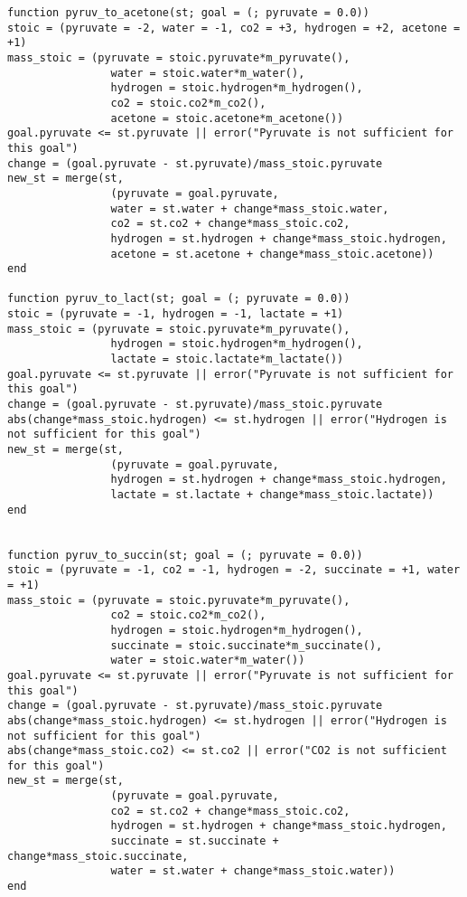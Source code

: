 \documentclass[11pt]{article}
\begin{document}
\begin{verbatim}
function pyruv_to_acetone(st; goal = (; pyruvate = 0.0))
stoic = (pyruvate = -2, water = -1, co2 = +3, hydrogen = +2, acetone = +1)
mass_stoic = (pyruvate = stoic.pyruvate*m_pyruvate(),
                water = stoic.water*m_water(),
                hydrogen = stoic.hydrogen*m_hydrogen(),
                co2 = stoic.co2*m_co2(),
                acetone = stoic.acetone*m_acetone())
goal.pyruvate <= st.pyruvate || error("Pyruvate is not sufficient for this goal")
change = (goal.pyruvate - st.pyruvate)/mass_stoic.pyruvate
new_st = merge(st,
                (pyruvate = goal.pyruvate,
                water = st.water + change*mass_stoic.water,
                co2 = st.co2 + change*mass_stoic.co2,
                hydrogen = st.hydrogen + change*mass_stoic.hydrogen,
                acetone = st.acetone + change*mass_stoic.acetone))
end

function pyruv_to_lact(st; goal = (; pyruvate = 0.0))
stoic = (pyruvate = -1, hydrogen = -1, lactate = +1)
mass_stoic = (pyruvate = stoic.pyruvate*m_pyruvate(),
                hydrogen = stoic.hydrogen*m_hydrogen(),
                lactate = stoic.lactate*m_lactate())
goal.pyruvate <= st.pyruvate || error("Pyruvate is not sufficient for this goal")
change = (goal.pyruvate - st.pyruvate)/mass_stoic.pyruvate
abs(change*mass_stoic.hydrogen) <= st.hydrogen || error("Hydrogen is not sufficient for this goal")
new_st = merge(st,
                (pyruvate = goal.pyruvate,
                hydrogen = st.hydrogen + change*mass_stoic.hydrogen,
                lactate = st.lactate + change*mass_stoic.lactate))
end


function pyruv_to_succin(st; goal = (; pyruvate = 0.0))
stoic = (pyruvate = -1, co2 = -1, hydrogen = -2, succinate = +1, water = +1)
mass_stoic = (pyruvate = stoic.pyruvate*m_pyruvate(),
                co2 = stoic.co2*m_co2(),
                hydrogen = stoic.hydrogen*m_hydrogen(),
                succinate = stoic.succinate*m_succinate(),
                water = stoic.water*m_water())
goal.pyruvate <= st.pyruvate || error("Pyruvate is not sufficient for this goal")
change = (goal.pyruvate - st.pyruvate)/mass_stoic.pyruvate
abs(change*mass_stoic.hydrogen) <= st.hydrogen || error("Hydrogen is not sufficient for this goal")
abs(change*mass_stoic.co2) <= st.co2 || error("CO2 is not sufficient for this goal")
new_st = merge(st,
                (pyruvate = goal.pyruvate,
                co2 = st.co2 + change*mass_stoic.co2,
                hydrogen = st.hydrogen + change*mass_stoic.hydrogen,
                succinate = st.succinate + change*mass_stoic.succinate,
                water = st.water + change*mass_stoic.water))
end 

\end{verbatim}
\end{document}
